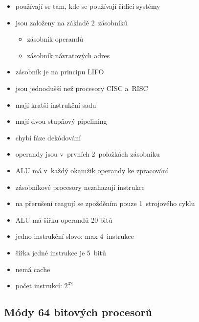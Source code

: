 \documentclass[a4paper,12pt]{article}
\providecommand{\tightlist}{%
\setlength{\itemsep}{0pt}\setlength{\parskip}{0pt}}
\begin{document}
\begin{itemize}
\tightlist
\item používají se tam, kde se používají řídící systémy
\item jsou založeny na základě 2~zásobníků

  \begin{itemize}
  \tightlist
  \item zásobník operandů
  \item zásobník návratových adres
  \end{itemize}
\item zásobník je na principu LIFO
\item jsou jednodušší než procesory CISC a~RISC
\item mají kratší instrukční sadu
\item mají dvou stupňový pipelining
\item chybí fáze dekódování
\item operandy jsou v~prvních 2~položkách zásobníku
\item ALU má v~každý okamžik operandy ke zpracování
\item zásobníkové procesory nezahazují instrukce
\item na přerušení reagují se zpožděním pouze 1~strojového cyklu
\item ALU má šířku operandů 20 bitů
\item jedno instrukční slovo: max 4~instrukce
\item šířka jedné instrukce je 5~bitů
\item nemá cache
\item počet instrukcí: $2^{32}$
\end{itemize}

\subsection{Módy 64 bitových procesorů}
\end{document}

